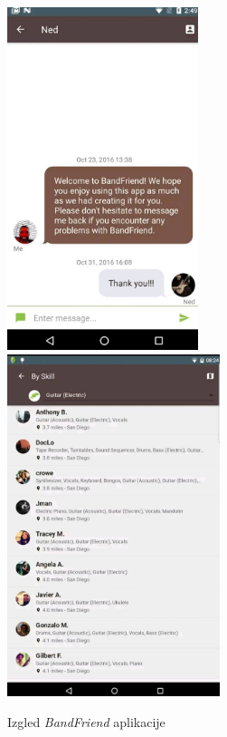 		\begin{figure}[H]
			\begin{center}
				\includegraphics[height=10cm]{slike/BandFriend.JPEG}
				\includegraphics[height=10cm]{slike/BandFriend2.JPEG}
			\end{center}
			\caption{Izgled \textit{BandFriend} aplikacije}
			\label{fig:promjene3}
		\end{figure}

		
		\eject
		
	
